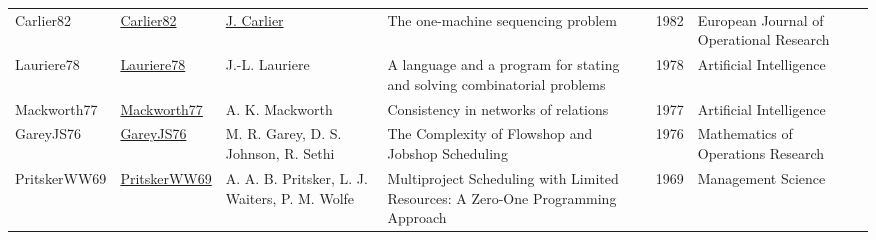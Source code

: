{\begin{longtable}{p{2cm}p{2cm}p{5cm}p{10cm}rp{3cm}l}
Carlier82 & \href{http://dx.doi.org/10.1016/s0377-2217(82)80007-6}{Carlier82} & \hyperref[auth:a845]{J. Carlier} & The one-machine sequencing problem & 1982 & European Journal of Operational Research & \cite{Carlier82}\\
Lauriere78 & \href{http://dx.doi.org/10.1016/0004-3702(78)90029-2}{Lauriere78} & J.-L. Lauriere & A language and a program for stating and solving combinatorial problems & 1978 & Artificial Intelligence & \cite{Lauriere78}\\
Mackworth77 & \href{http://dx.doi.org/10.1016/0004-3702(77)90007-8}{Mackworth77} & A. K. Mackworth & Consistency in networks of relations & 1977 & Artificial Intelligence & \cite{Mackworth77}\\
GareyJS76 & \href{http://dx.doi.org/10.1287/moor.1.2.117}{GareyJS76} & M. R. Garey, D. S. Johnson, R. Sethi & The Complexity of Flowshop and Jobshop Scheduling & 1976 & Mathematics of Operations Research & \cite{GareyJS76}\\
PritskerWW69 & \href{http://dx.doi.org/10.1287/mnsc.16.1.93}{PritskerWW69} & A. A. B. Pritsker, L. J. Waiters, P. M. Wolfe & Multiproject Scheduling with Limited Resources: A Zero-One Programming Approach & 1969 & Management Science & \cite{PritskerWW69}\\
\end{longtable}
}

